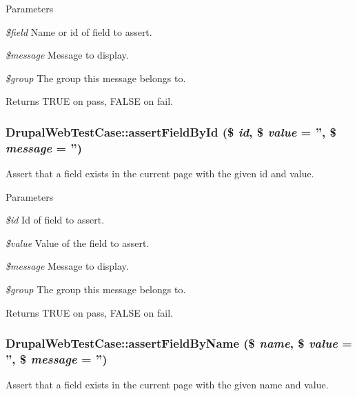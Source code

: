 \begin{DoxyParams}{Parameters}
\item[{\em \$field}]Name or id of field to assert. \item[{\em \$message}]Message to display. \item[{\em \$group}]The group this message belongs to. \end{DoxyParams}
\begin{DoxyReturn}{Returns}
TRUE on pass, FALSE on fail. 
\end{DoxyReturn}
\hypertarget{class_drupal_web_test_case_ad3779958ca911e96582177f110278111}{
\subsubsection[{assertFieldById}]{\setlength{\rightskip}{0pt plus 5cm}DrupalWebTestCase::assertFieldById (\$ {\em id}, \/  \$ {\em value} = {\ttfamily ''}, \/  \$ {\em message} = {\ttfamily ''})}}
\label{class_drupal_web_test_case_ad3779958ca911e96582177f110278111}
Assert that a field exists in the current page with the given id and value.


\begin{DoxyParams}{Parameters}
\item[{\em \$id}]Id of field to assert. \item[{\em \$value}]Value of the field to assert. \item[{\em \$message}]Message to display. \item[{\em \$group}]The group this message belongs to. \end{DoxyParams}
\begin{DoxyReturn}{Returns}
TRUE on pass, FALSE on fail. 
\end{DoxyReturn}
\hypertarget{class_drupal_web_test_case_ad2df17adcfef4a514e78c6a287022690}{
\subsubsection[{assertFieldByName}]{\setlength{\rightskip}{0pt plus 5cm}DrupalWebTestCase::assertFieldByName (\$ {\em name}, \/  \$ {\em value} = {\ttfamily ''}, \/  \$ {\em message} = {\ttfamily ''})}}
\label{class_drupal_web_test_case_ad2df17adcfef4a514e78c6a287022690}
Assert that a field exists in the current page with the given name and value.


